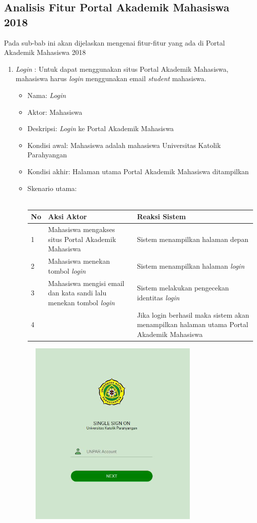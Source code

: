 \subsection{Analisis Fitur Portal Akademik Mahasiswa 2018}
Pada sub-bab ini akan dijelaskan mengenai fitur-fitur yang ada di Portal Akademik Mahasiswa 2018
\begin{enumerate}
    \item \textit{Login} : 
    Untuk dapat menggunakan situs Portal Akademik Mahasiswa, mahasiswa harus \textit{login} menggunakan email \textit{student} mahasiswa.
    \begin{itemize}
			\item Nama: \textit{Login}
			\item Aktor: Mahasiswa
			\item Deskripsi: \textit{Login} ke Portal Akademik Mahasiswa 
			\item Kondisi awal: Mahasiswa adalah mahasiswa Universitas Katolik Parahyangan
			\item Kondisi akhir: Halaman utama Portal Akademik Mahasiswa ditampilkan 
			\item Skenario utama: \\ \\
        \begin{tabular}{|p{0.5cm} |p{6cm}| p{6cm}|}
        \hline
            No & Aksi Aktor &  Reaksi Sistem \\ \hline     
            1 & Mahasiswa mengakses situs Portal Akademik Mahasiswa & Sistem menampilkan halaman depan \\ \hline 
            2 & Mahasiswa menekan tombol \textit{login} & Sistem menampilkan halaman \textit{login}\\ \hline 
            3 & Mahasiswa mengisi email dan kata sandi lalu menekan tombol \textit{login} & Sistem melakukan pengecekan identitas \textit{login} \\ \hline 
            4 & & Jika login berhasil maka sistem akan menampilkan halaman utama Portal Akademik Mahasiswa\\ \hline 
        \end{tabular}
    \end{itemize}
    \begin{figure}[H]
				\centering
				\includegraphics[scale=0.7]{Gambar/login_pam}

\end{figure}
\end{enumerate}

